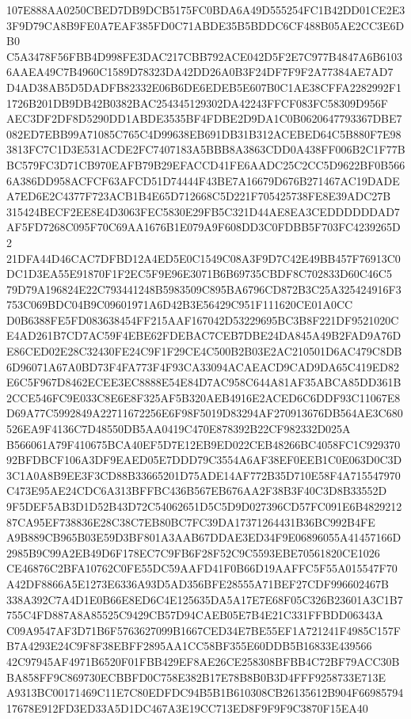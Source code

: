 \documentclass[UTF8,fontset=fandol,zihao=-4,a4paper]{ctexart}
\begin{document}
{{107E888AA0250CBED7DB9DCB5175FC0BDA6A49D555254FC1B42DD01CE2E33F9D79CA8B9FE0A7EAF385FD0C71ABDE35B5BDDC6CF488B05AE2CC3E6DB0
C5A3478F56FBB4D998FE3DAC217CBB792ACE042D5F2E7C977B4847A6B61036AAEA49C7B4960C1589D78323DA42DD26A0B3F24DF7F9F2A77384AE7AD7
D4AD38AB5D5DADFB82332E06B6DE6EDEB5E607B0C1AE38CFFA2282992F11726B201DB9DB42B0382BAC254345129302DA42243FFCF083FC58309D956F
AEC3DF2DF8D5290DD1ABDE3535BF4FDBE2D9DA1C0B0620647793367DBE7082ED7EBB99A71085C765C4D99638EB691DB31B312ACEBED64C5B880F7E98
3813FC7C1D3E531ACDE2FC7407183A5BBB8A3863CDD0A438FF006B2C1F77BBC579FC3D71CB970EAFB79B29EFACCD41FE6AADC25C2CC5D9622BF0B566
6A386DD958ACFCF63AFCD51D74444F43BE7A16679D676B271467AC19DADEA7ED6E2C4377F723ACB1B4E65D712668C5D221F705425738FE8E39ADC27B
315424BECF2EE8E4D3063FEC5830E29FB5C321D44AE8EA3CEDDDDDDAD7AF5FD7268C095F70C69AA1676B1E079A9F608DD3C0FDBB5F703FC4239265D2
21DFA44D46CAC7DFBD12A4ED5E0C1549C08A3F9D7C42E49BB457F76913C0DC1D3EA55E91870F1F2EC5F9E96E3071B6B69735CBDF8C702833D60C46C5
79D79A196824E22C793441248B5983509C895BA6796CD872B3C25A325424916F3753C069BDC04B9C09601971A6D42B3E56429C951F111620CE01A0CC
D0B6388FE5FD083638454FF215AAF167042D53229695BC3B8F221DF9521020CE4AD261B7CD7AC59F4EBE62FDEBAC7CEB7DBE24DA845A49B2FAD9A76D
E86CED02E28C32430FE24C9F1F29CE4C500B2B03E2AC210501D6AC479C8DB6D96071A67A0BD73F4FA773F4F93CA33094ACAEACD9CAD9DA65C419ED82
E6C5F967D8462ECEE3EC8888E54E84D7AC958C644A81AF35ABCA85DD361B2CCE546FC9E033C8E6E8F325AF5B320AEB4916E2ACED6C6DDF93C11067E8
D69A77C5992849A22711672256E6F98F5019D83294AF270913676DB564AE3C680526EA9F4136C7D48550DB5AA0419C470E878392B22CF982332D025A
B566061A79F410675BCA40EF5D7E12EB9ED022CEB48266BC4058FC1C92937092BFDBCF106A3DF9EAED05E7DDD79C3554A6AF38EF0EEB1C0E063D0C3D
3C1A0A8B9EE3F3CD88B33665201D75ADE14AF772B35D710E58F4A715547970C473E95AE24CDC6A313BFFBC436B567EB676AA2F38B3F40C3D8B33552D
9F5DEF5AB3D1D52B43D72C54062651D5C5D9D027396CD57FC091E6B482921287CA95EF738836E28C38C7EB80BC7FC39DA17371264431B36BC992B4FE
A9B889CB965B03E59D3BF801A3AAB67DDAE3ED34F9E06896055A41457166D2985B9C99A2EB49D6F178EC7C9FB6F28F52C9C5593EBE70561820CE1026
CE46876C2BFA10762C0FE55DC59AAFD41F0B66D19AAFFC5F55A015547F70A42DF8866A5E1273E6336A93D5AD356BFE28555A71BEF27CDF996602467B
338A392C7A4D1E0B66E8ED6C4E125635DA5A17E7E68F05C326B23601A3C1B7755C4FD887A8A85525C9429CB57D94CAEB05E7B4E21C331FFBDD06343A
C09A9547AF3D71B6F5763627099B1667CED34E7BE55EF1A721241F4985C157FB7A4293E24C9F8F38EBFF2895AA1CC58BF355E60DDB5B16833E439566
42C97945AF4971B6520F01FBB429EF8AE26CE258308BFBB4C72BF79ACC30BBA858FF9C869730ECBBFD0C758E382B17E78B8B0B3D4FFF9258733E713E
A9313BC00171469C11E7C80EDFDC94B5B1B610308CB26135612B904F6698579417678E912FD3ED33A5D1DC467A3E19CC713ED8F9F9F9C3870F15EA40
}}
\end{document}
